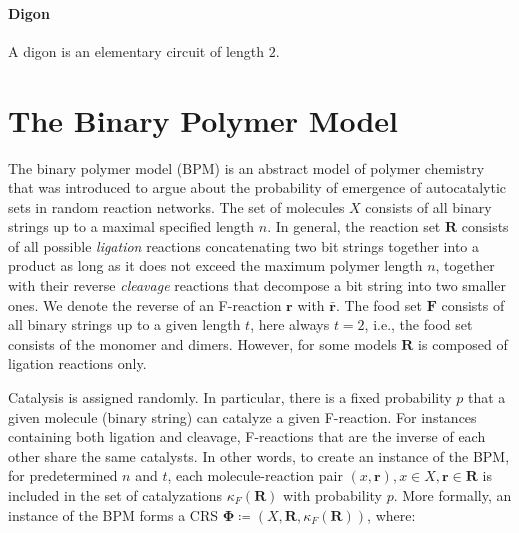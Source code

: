 \documentclass[pdflatex]{sn-jnl}
\theoremstyle{thmstyleone}%
\theoremstyle{examplesty}%
\theoremstyle{thmstylethree}%
\newcommand{\food}{\ensuremath{\mathbf{F}}}
\newcommand{\FR}[0]{\mathbf{R}}
\newcommand{\fr}[0]{\mathbf{r}}
\newcommand{\cat}{\kappa_F}
\begin{document}
\paragraph{Digon} A digon is an elementary circuit of length $2$.

\section{The Binary Polymer Model}\label{sec:BinPol}

The binary polymer model (BPM) is an abstract model of polymer chemistry that was introduced to argue about the probability of emergence of autocatalytic sets in random reaction networks. The set of molecules $X$ consists of all binary strings up to a maximal specified length $n$. In general, the reaction set $\FR$ consists of all possible \emph{ligation} reactions concatenating two bit strings together into a product as long as it does not exceed the maximum polymer length $n$, together with their reverse \emph{cleavage} reactions that decompose a bit string into two smaller ones. We denote the reverse of an F-reaction $\fr$ with $\bar{\fr}$. The food set $\food$ consists of all binary strings up to a given length $t$, here always $t=2$, i.e., the food set consists of the monomer and dimers. However, for some models $\FR$ is composed of ligation reactions only.

Catalysis is assigned randomly. In particular, there is a fixed probability $p$ that a given molecule (binary string) can catalyze a given F-reaction. For instances containing both ligation and cleavage, F-reactions that are the inverse of each other share the same catalysts. In other words, to create an instance of the BPM, for predetermined $n$ and $t$, each molecule-reaction pair $(x,\fr), x \in X, \fr \in \FR$ is included in the set of catalyzations $\cat(\FR)$ with probability $p$. More formally, an instance of the BPM forms a CRS $\mathbf{\Phi}\coloneqq (X, \FR, \cat(\FR))$, where:\\
\end{document}
